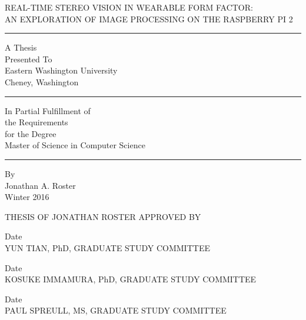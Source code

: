\documentclass[12]{report}
\begin{document}
\doublespace
\thispagestyle{empty}
\begin{center}
	REAL-TIME STEREO VISION IN WEARABLE FORM FACTOR:\\ AN EXPLORATION OF IMAGE PROCESSING ON THE RASPBERRY PI 2
\end{center}
\hrule
\begin{center}
	A Thesis\\
	Presented To\\
	Eastern Washington University\\
	Cheney, Washington\\
\end{center}
\hrule
\begin{center}
	In Partial Fulfillment of \\
	the Requirements\\
	for the Degree \\
	Master of Science in Computer Science\\
\end{center}
	\hrule
\begin{center}
	By \\
	Jonathan A. Roster\\
	Winter 2016
\end{center}
\newpage
\vspace{.75in}
\begin{center}
THESIS OF JONATHAN ROSTER APPROVED BY
\end{center}
\vspace{1.5in}
\begin{center}
\makebox[3in]{\hrulefill} Date\makebox[1.0in]{\hrulefill}\\
YUN TIAN, PhD, GRADUATE STUDY COMMITTEE

\vspace{.75in}

\makebox[3in]{\hrulefill} Date\makebox[1.0in]{\hrulefill}\\
KOSUKE IMMAMURA, PhD, GRADUATE STUDY COMMITTEE

\vspace{.75in}

\makebox[3in]{\hrulefill} Date\makebox[1.0in]{\hrulefill}\\
PAUL SPREULL, MS, GRADUATE STUDY COMMITTEE
\end{center}
\end{document}
